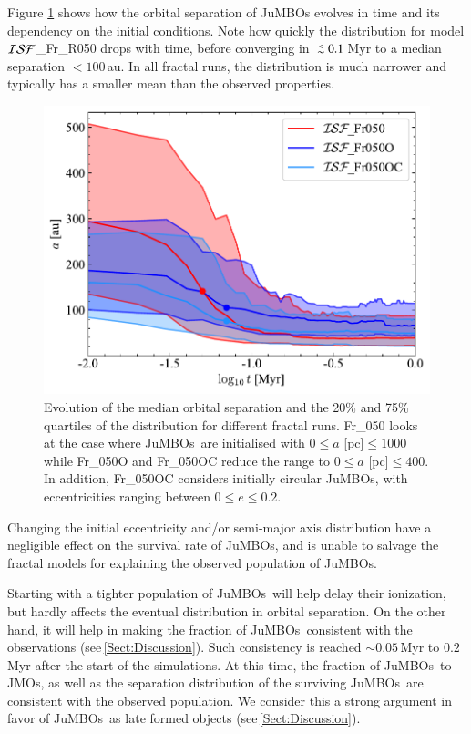\documentclass[submission,phys]{lib/SciPost}
\def\aplt{\ {\raise-.5ex\hbox{$\buildrel<\over\sim$}}\ }
\newcommand{\jumbos}{\mbox{JuMBOs}}
\begin{document}
Figure \ref{Fig:sma_vs_time_model_ISF_Fr} shows how the orbital separation 
of JuMBOs evolves in time and its dependency on the initial conditions. 
Note how quickly the distribution for model ${\cal
  ISF}$\_Fr\_R050 drops with time, before converging in $\aplt
0.1$\,Myr to a median separation $<100$\,au.  In all fractal runs, the
distribution is much narrower and typically has a smaller mean than the 
observed properties.

\begin{figure}
  \centering
        \includegraphics[width=0.75\columnwidth]{figures/Fractal_GenObs_sem_evol.pdf}
        \caption{Evolution of the median orbital separation and the
          20\% and 75\% quartiles of the distribution for different
          fractal runs.  Fr\_050 looks at the case where \jumbos\ are
          initialised with $0\leq a$ [pc]$\leq 1000$ while Fr\_050O
          and Fr\_050OC reduce the range to $0\leq a$ [pc]$\leq
          400$. In addition, Fr\_050OC considers initially circular
          JuMBOs, with eccentricities ranging between $0\leq e\leq
          0.2$. }
        \label{Fig:sma_vs_time_model_ISF_Fr}
\end{figure}

Changing the initial eccentricity and/or semi-major axis distribution have a 
negligible effect on the survival rate of JuMBOs, and is unable to salvage 
the fractal models for explaining the observed population of \jumbos.  

Starting with a tighter population of \jumbos\, will help delay their
ionization, but hardly affects the eventual distribution in orbital
separation.  On the other hand, it will help in making the fraction of
\jumbos\, consistent with the observations
(see\,\ref{Sect:Discussion}). Such consistency is reached $\sim
0.05$\,Myr to $0.2$\,Myr after the start of the simulations.  At this
time, the fraction of \jumbos\, to JMOs, as well as the separation
distribution of the surviving \jumbos\, are consistent with the
observed population. We consider this a strong argument in favor of
\jumbos\, as late formed objects (see\,\ref{Sect:Discussion}).
\end{document}
